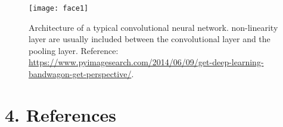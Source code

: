 \documentclass[12pt,a4paper,authoryear]{elsarticle}
\begin{document}
	 \begin{figure}[H]
	 	\begin{center}
	 		\texttt{[image: face1]}
	 		\caption{Architecture of a typical convolutional neural network. non-linearity layer are usually included between the convolutional layer and the pooling layer. Reference: \url{https://www.pyimagesearch.com/2014/06/09/get-deep-learning-bandwagon-get-perspective/}.}
	 	\end{center}
	 \end{figure}

\section*{4.  References}

\end{document}
